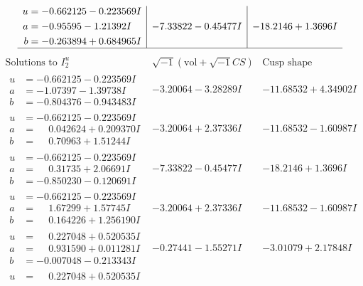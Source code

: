 \documentclass[1p]{elsarticle_modified}
\theoremstyle{definition}
\newcommand{\I}{\sqrt{-1}}
\begin{document}
$$\begin{array}{c|c|c}
\begin{aligned}
u &= -0.662125 - 0.223569 I \\
a &= -0.95595 - 1.21392 I \\
b &= -0.263894 + 0.684965 I\end{aligned}
 & -7.33822 - 0.45477 I & -18.2146 + 1.3696 I\\
 \hline 
 \end{array}$$\newpage$$\begin{array}{c|c|c}  
\text{Solutions to }I^u_{2}& \I (\text{vol} + \sqrt{-1}CS) & \text{Cusp shape}\\
 \hline 
\begin{aligned}
u &= -0.662125 - 0.223569 I \\
a &= -1.07397 - 1.39738 I \\
b &= -0.804376 - 0.943483 I\end{aligned}
 & -3.20064 - 3.28289 I & -11.68532 + 4.34902 I \\ \hline\begin{aligned}
u &= -0.662125 - 0.223569 I \\
a &= \phantom{-}0.042624 + 0.209370 I \\
b &= \phantom{-}0.70963 + 1.51244 I\end{aligned}
 & -3.20064 + 2.37336 I & -11.68532 - 1.60987 I \\ \hline\begin{aligned}
u &= -0.662125 - 0.223569 I \\
a &= \phantom{-}0.31735 + 2.06691 I \\
b &= -0.850230 - 0.120691 I\end{aligned}
 & -7.33822 - 0.45477 I & -18.2146 + 1.3696 I \\ \hline\begin{aligned}
u &= -0.662125 - 0.223569 I \\
a &= \phantom{-}1.67299 + 1.57745 I \\
b &= \phantom{-}0.164226 + 1.256190 I\end{aligned}
 & -3.20064 + 2.37336 I & -11.68532 - 1.60987 I \\ \hline\begin{aligned}
u &= \phantom{-}0.227048 + 0.520535 I \\
a &= \phantom{-}0.931590 + 0.011281 I \\
b &= -0.007048 - 0.213343 I\end{aligned}
 & -0.27441 - 1.55271 I & -3.01079 + 2.17848 I \\ \hline\begin{aligned}
u &= \phantom{-}0.227048 + 0.520535 I \\

\end{aligned}
\end{array}$$
\end{document}
